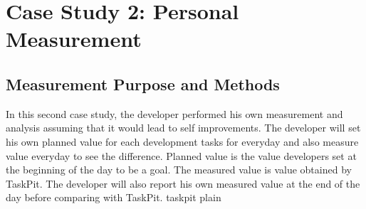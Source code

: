 \documentclass [paper]{ieice}
\begin{document}
\section{Case Study 2: Personal Measurement}

\subsection{Measurement Purpose and Methods}
	In this second case study, the developer performed his own measurement and analysis assuming that it would lead to self improvements. The developer will set his own planned value for each development tasks for everyday and also measure value everyday to see the difference. Planned value is the value developers set at the beginning of the day to be a goal. The measured value is value obtained by TaskPit. The developer will also report his own measured value at the end of the day before comparing with TaskPit.
 {taskpit}
 {plain}
	
\end{document}
